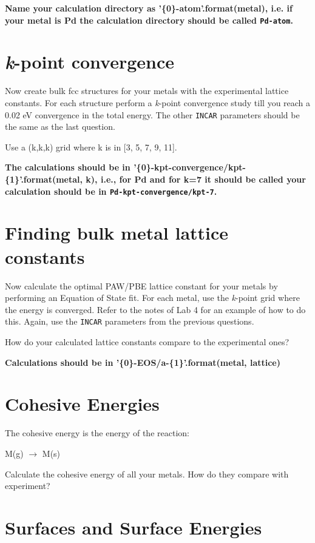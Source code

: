\documentclass[11pt]{article}
\begin{document}
\textbf{Name your calculation directory as '\{0\}-atom'.format(metal), i.e. if your metal is Pd the calculation directory should be called \texttt{Pd-atom}.}

\section{\emph{k}-point convergence}
\label{sec-2}

Now create bulk fcc structures for your metals with the experimental lattice constants. For each structure perform a \emph{k}-point convergence study till you reach a 0.02 eV convergence in the total energy. The other \texttt{INCAR} parameters should be the same as the last question.

Use a (k,k,k) grid where k is in [3, 5, 7, 9, 11].

\textbf{The calculations should be in '\{0\}-kpt-convergence/kpt-\{1\}'.format(metal, k), i.e., for Pd and for k=7 it should be called your calculation should be in \texttt{Pd-kpt-convergence/kpt-7}.} 

\section{Finding bulk metal lattice constants}
\label{sec-3}

Now calculate the optimal PAW/PBE lattice constant for your metals by performing an Equation of State fit. For each metal, use the \emph{k}-point grid where the energy is converged. Refer to the notes of Lab 4 for an example of how to do this. Again, use the \texttt{INCAR} parameters from the previous questions. 

How do your calculated lattice constants compare to the experimental ones?

\textbf{Calculations should be in '\{0\}-EOS/a-\{1\}'.format(metal, lattice)}

\section{Cohesive Energies}
\label{sec-4}

The cohesive energy is the energy of the reaction:

M(g) $\rightarrow$ M(s)

Calculate the cohesive energy of all your metals. How do they compare with experiment?



\section{Surfaces and Surface Energies}
\label{sec-5}
\end{document}
